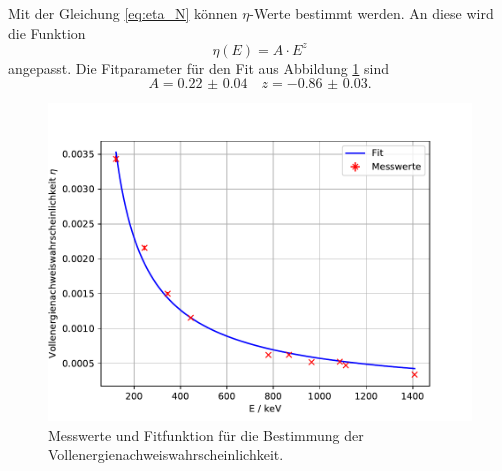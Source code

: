 \FloatBarrier
Mit der Gleichung \eqref{eq:eta_N} können $\eta$-Werte bestimmt werden. An diese wird die Funktion 
\begin{equation*}
  \eta(E) = A\cdot E ^z
\end{equation*}
angepasst. 
Die Fitparameter für den Fit aus Abbildung \ref{fig:Vollenergienachweiswahrscheinlichkeit} sind 
\begin{equation*}
  A = \num{0.22(4)} \quad z = \num{-0.86(3)}.
\end{equation*}
\begin{figure}
  \centering
  \caption{Messwerte und Fitfunktion für die Bestimmung der Vollenergienachweiswahrscheinlichkeit.}
  \label{fig:Vollenergienachweiswahrscheinlichkeit}
  \includegraphics[width = \textwidth, keepaspectratio]{figure/Vollenergienachweiswahrscheinlichkeit.pdf}
\end{figure}
\FloatBarrier
